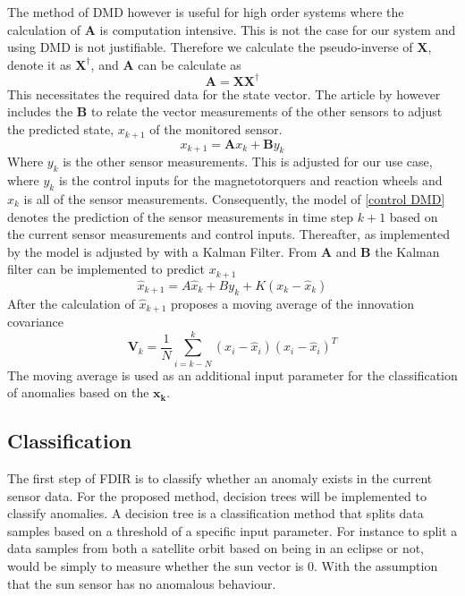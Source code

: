 \documentclass[letterpaper, 10 pt, conference]{ieeeconf}  %
\begin{document}
The method of DMD however is useful for high order systems where the calculation of $\mathbf{A}$ is computation intensive. This is not the case for our system and using DMD is not justifiable. Therefore we calculate the pseudo-inverse of $\mathbf{X}$, denote it as $\mathbf{X^{\dagger}}$, and $\mathbf{A}$ can be calculate as
\begin{equation}
	\mathbf{A} = \mathbf{X}\mathbf{X^{\dagger}}
\end{equation}
This necessitates the required data for the state vector. The article by \textcite{DeSilva2020} however includes the $\mathbf{B}$ to relate the vector measurements of the other sensors to adjust the predicted state, $x_{k+1}$ of the monitored sensor. 
\begin{equation}
	x_{k+1} = \boldsymbol{A}x_k + \boldsymbol{B}y_k
	\label{control DMD}
\end{equation}
Where $y_k$ is the other sensor measurements. This is adjusted for our use case, where $y_k$ is the control inputs for the magnetotorquers and reaction wheels and $x_k$ is all of the sensor measurements. Consequently, the model of \ref{control DMD} denotes the prediction of the sensor measurements in time step $k+1$ based on the current sensor measurements and control inputs.
Thereafter, as implemented by \textcite{DeSilva2020} the model is adjusted by with a Kalman Filter. From $\boldsymbol{A}$ and $\boldsymbol{B}$ the Kalman filter can be implemented to predict $x_{k+1}$
\begin{equation}
	\hat{x}_{k+1} = A\hat{x}_k + By_k + K(x_k - \hat{x}_k)
\end{equation}
After  the calculation of $\hat{x}_{k+1}$ \textcite{DeSilva2020} proposes a moving average of the innovation covariance
\begin{equation}
	\boldsymbol{V}_k = \frac{1}{N} \sum_{i=k-N}^k (x_i - \hat{x}_i)(x_i - \hat{x}_i)^T
\end{equation}
The moving average is used as an additional input parameter for the classification of anomalies based on the $\boldsymbol{x_k}$.

\subsection{Classification}
The first step of FDIR is to classify whether an anomaly exists in the current sensor data. For the proposed method, decision trees will be implemented to classify anomalies. A decision tree is a classification method that splits data samples based on a threshold of a specific input parameter. For instance to split a data samples from both a satellite orbit based on being in an eclipse or not, would be simply to measure whether the sun vector is $0$. With the assumption that the sun sensor has no anomalous behaviour.
\end{document}
